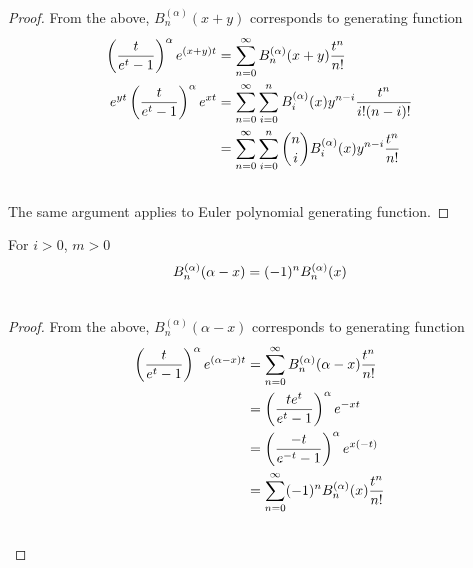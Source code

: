 \documentclass[fleqn,a4paper,9pt]{article}
\begin{document}
\begin{flushleft}
\begin{proof}
From the above,  $B_{n}^{(\alpha)}(x+y)$ corresponds to generating function 
\begin{align}
\left(\frac{t}{e^t-1}\right)^\alpha e^{(x+y)t}&=\sum_{n=0}^\infty B_n^{(\alpha)}(x+y)\frac{t^n}{n!}\\\notag
e^{yt}\left(\frac{t}{e^t-1}\right)^\alpha e^{xt}&=\sum_{n=0}^\infty\sum_{i=0}^n B_i^{(\alpha)}(x)y^{n-i}\frac{t^n}{i!(n-i)!}\\\notag
&=\sum_{n=0}^\infty\sum_{i=0}^n \binom{n}{i}B_i^{(\alpha)}(x)y^{n-i}\frac{t^n}{n!}\\\notag
\end{align}
The same argument applies to Euler polynomial generating function.
\end{proof}
\begin{proposition}\label{addAlpha}
For $i>0$, $m>0$
\begin{align}
B_{n}^{(\alpha)}(\alpha -x)&=(-1)^n B_n^{(\alpha)}(x)\\\notag
\end{align}
\end{proposition}
\begin{proof}
From the above,  $B_{n}^{(\alpha)}(\alpha -x)$ corresponds to generating function 
\begin{align}
\left(\frac{t}{e^t-1}\right)^\alpha e^{(\alpha-x)t}&=\sum_{n=0}^\infty B_n^{(\alpha)}(\alpha-x)\frac{t^n}{n!}\\\notag
&=\left(\frac{t e^t}{e^t-1}\right)^\alpha e^{-xt}\\\notag
&=\left(\frac{-t}{e^{-t}-1}\right)^\alpha e^{x(-t)}\\\notag
&=\sum_{n=0}^\infty (-1)^n B_n^{(\alpha)}(x)\frac{t^n}{n!}\\\notag
\end{align}


\end{proof}
\end{flushleft}
\end{document}
